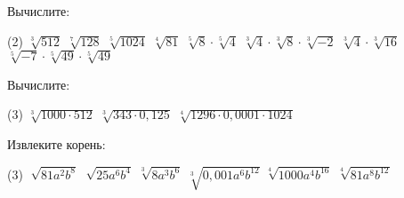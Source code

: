 \begin{class}[number=2]
	\begin{listofex}
		\item Вычислите:
		\begin{tasks}(2)
			\task \( \sqrt[3]{512} \)
			\task \( \sqrt[7]{128} \)
			\task \( \sqrt[5]{1024} \)
			\task \( \sqrt[4]{81} \)
			\task \( \sqrt[5]{8} \cdot \sqrt[5]{4} \)
			\task \( \sqrt[3]{4} \cdot \sqrt[3]{8} \cdot \sqrt[3]{-2} \)
			\task \( \sqrt[3]{4} \cdot \sqrt[3]{16} \)
			\task \( \sqrt[5]{-7} \cdot \sqrt[5]{49} \cdot \sqrt[5]{49} \)
		\end{tasks}
		\item Вычислите:
		\begin{tasks}(3)
			\task \( \sqrt[3]{1000 \cdot 512} \)
			\task \( \sqrt[3]{343 \cdot 0,125} \)
			\task \( \sqrt[4]{1296 \cdot 0,0001 \cdot 1024} \)
		\end{tasks}
		\item Извлеките корень:
		\begin{tasks}(3)
			\task \( \sqrt[]{ 81a^2b^8 } \)
			\task \( \sqrt[]{ 25a^6b^4 } \)
			\task \( \sqrt[3]{ 8a^3b^6 } \)
			\task \( \sqrt[3]{ 0,001a^6b^{12} } \)
			\task \( \sqrt[4]{ 1000a^4b^{16} } \)
			\task \( \sqrt[4]{ 81a^8b^{12}} \)
		\end{tasks}
		

\end{listofex}
\end{class}
